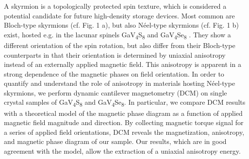 A skyrmion is a topologically protected spin texture, which is considered a potential candidate for future high-density storage devices. Most common are Bloch-type skyrmions (cf. Fig. 1 a), but also N\'{e}el-type skyrmions (cf. Fig. 1 b) exist, hosted e.g. in the lacunar spinels GaV\textsubscript{4}S\textsubscript{8} and GaV\textsubscript{4}Se\textsubscript{8} \cite{K_zsm_rki_2015}. They show a different orientation of the spin rotation, but also differ from their Bloch-type counterparts in that their orientation is determined by uniaxial anisotropy instead of an externally applied magnetic field. This anisotropy is apparent in a strong dependence of the magnetic phases on field orientation.
In order to quantify and understand the role of anisotropy in materials hosting N{\'e}el-type skyrmions, we perform dynamic cantilever magnetometry (DCM) \cite{Gross_2016} on single crystal samples of GaV\textsubscript{4}S\textsubscript{8} and GaV\textsubscript{4}Se\textsubscript{8}. In particular, we compare DCM results with a theoretical model of the magnetic phase diagram as a function of applied magnetic field magnitude and direction. By collecting magnetic torque signal for a series of applied field orientations, DCM reveals the magnetization, anisotropy, and magnetic phase diagram of our sample. Our results, which are in good agreement with the model, allow the extraction of a uniaxial anisotropy energy.